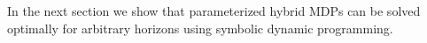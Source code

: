 

In the next section we show that parameterized hybrid MDPs can be solved optimally for arbitrary horizons using symbolic dynamic programming.